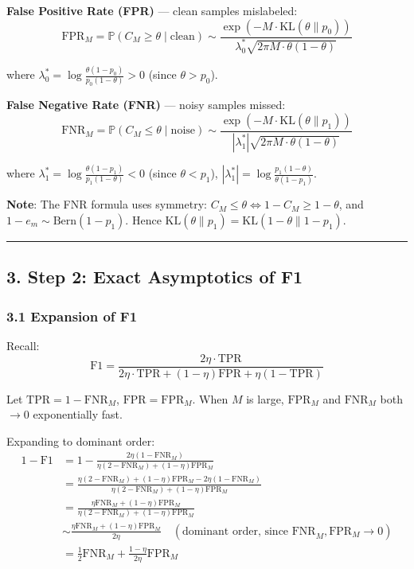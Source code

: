 \documentclass[
  12pt,
]{article}
\begin{document}
\textbf{False Positive Rate (FPR)} — clean samples mislabeled:
\[\text{FPR}_M = \mathbb{P}(C_M \geq \theta \mid \text{clean}) \sim \frac{\exp(-M \cdot \text{KL}(\theta \| p_0))}{\lambda_0^* \sqrt{2\pi M \cdot \theta(1-\theta)}}\]

where \(\lambda_0^* = \log\frac{\theta(1-p_0)}{p_0(1-\theta)} > 0\) (since \(\theta > p_0\)).

\textbf{False Negative Rate (FNR)} — noisy samples missed:
\[\text{FNR}_M = \mathbb{P}(C_M \leq \theta \mid \text{noise}) \sim \frac{\exp(-M \cdot \text{KL}(\theta \| p_1))}{|\lambda_1^*| \sqrt{2\pi M \cdot \theta(1-\theta)}}\]

where \(\lambda_1^* = \log\frac{\theta(1-p_1)}{p_1(1-\theta)} < 0\) (since \(\theta < p_1\)), \(|\lambda_1^*| = \log\frac{p_1(1-\theta)}{\theta(1-p_1)}\).

\textbf{Note}: The FNR formula uses symmetry: \(C_M \leq \theta \iff 1-C_M \geq 1-\theta\), and \(1-e_m \sim \text{Bern}(1-p_1)\). Hence \(\text{KL}(\theta \| p_1) = \text{KL}(1-\theta \| 1-p_1)\).

\begin{center}\rule{0.5\linewidth}{0.5pt}\end{center}

\subsection{3. Step 2: Exact Asymptotics of F1}\label{step-2-exact-asymptotics-of-f1}

\subsubsection{3.1 Expansion of F1}\label{expansion-of-f1}

Recall:
\[\text{F1} = \frac{2\eta \cdot \text{TPR}}{2\eta \cdot \text{TPR} + (1-\eta)\text{FPR} + \eta(1-\text{TPR})}\]

Let \(\text{TPR} = 1 - \text{FNR}_M\), \(\text{FPR} = \text{FPR}_M\). When \(M\) is large, \(\text{FPR}_M\) and \(\text{FNR}_M\) both \(\to 0\) exponentially fast.

Expanding to dominant order: \[\begin{aligned}
1 - \text{F1} &= 1 - \frac{2\eta(1-\text{FNR}_M)}{\eta(2-\text{FNR}_M) + (1-\eta)\text{FPR}_M} \\
&= \frac{\eta(2-\text{FNR}_M) + (1-\eta)\text{FPR}_M - 2\eta(1-\text{FNR}_M)}{\eta(2-\text{FNR}_M) + (1-\eta)\text{FPR}_M} \\
&= \frac{\eta\text{FNR}_M + (1-\eta)\text{FPR}_M}{\eta(2-\text{FNR}_M) + (1-\eta)\text{FPR}_M} \\
&\sim \frac{\eta\text{FNR}_M + (1-\eta)\text{FPR}_M}{2\eta} \quad (\text{dominant order, since FNR}_M, \text{FPR}_M \to 0) \\
&= \frac{1}{2}\text{FNR}_M + \frac{1-\eta}{2\eta}\text{FPR}_M
\end{aligned}\]
\end{document}
